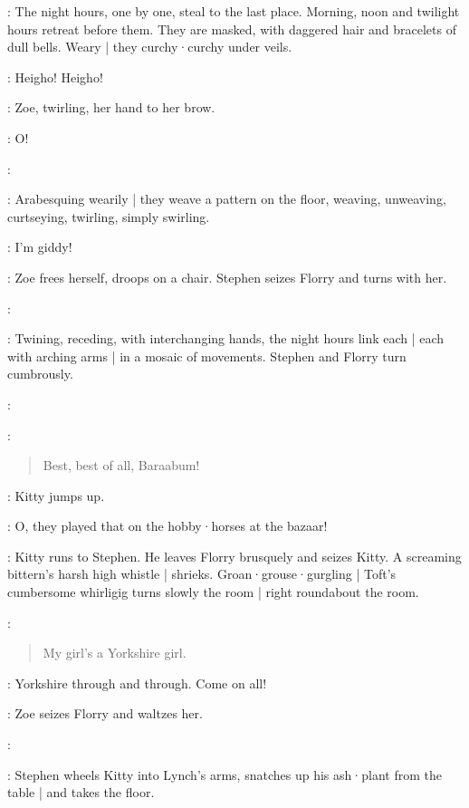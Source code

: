 :
The night hours,
one by one,
steal to the last place.
Morning,
noon and twilight hours retreat before them.
They are masked,
with daggered hair and bracelets of dull bells.
Weary |
they curchy·curchy under veils.

\Bracelets:
Heigho!
Heigho!

:
Zoe,
twirling,
her hand to her brow.

\Zoe:
O!

\Maginni:

:
Arabesquing wearily |
they weave a pattern on the floor,
weaving,
unweaving,
curtseying,
twirling,
simply swirling.

\Zoe:
I'm giddy!

:
Zoe frees herself,
droops on a chair.
Stephen seizes Florry and turns with her.

\Maginni:

:
Twining,
receding,
with interchanging hands,
the night hours link each |
each with arching arms |
in a mosaic of movements.
%
Stephen and Florry turn cumbrously.

\Maginni:

\Pianola[6b]:
\begin{verse}
    Best, best of all,
    Baraabum!
\end{verse}

:
Kitty jumps up.

\Kitty:
O,
they played that on the hobby·horses at the  bazaar!

:
Kitty runs to Stephen.
%
He leaves Florry brusquely and seizes Kitty.
A screaming bittern's harsh high whistle |
shrieks.
Groan·grouse·gurgling |
Toft's cumbersome whirligig turns slowly the room |
right roundabout the room.

\Pianola:
\begin{verse}
    My girl's a Yorkshire girl.
\end{verse}

\Zoe:
Yorkshire through and through.
Come on all!

:
Zoe seizes Florry and waltzes her.

\Stephen:

:
Stephen wheels Kitty into Lynch's arms,
snatches up his ash·plant from the table |
and takes the floor.

